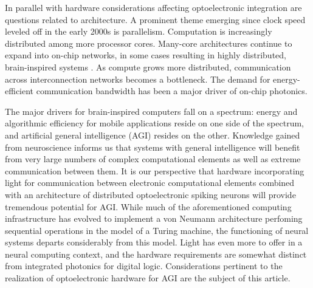 \documentclass[twocolumn]{article}
\begin{document}
In parallel with hardware considerations affecting optoelectronic integration are questions related to architecture. A prominent theme emerging since clock speed leveled off in the early 2000s is parallelism. Computation is increasingly distributed among more processor cores. Many-core architectures continue to expand into on-chip networks, in some cases resulting in highly distributed, brain-inspired systems \cite{bo2000,pfgr2013,mear2014,fuga2014,payu2017,dasr2018}. As compute grows more distributed, communication across interconnection networks becomes a bottleneck. The demand for energy-efficient communication bandwidth has been a major driver of on-chip photonics.

The major drivers for brain-inspired computers fall on a spectrum: energy and algorithmic efficiency for mobile applications reside on one side of the spectrum, and artificial general intelligence (AGI) resides on the other. Knowledge gained from neuroscience informs us that systems with general intelligence will benefit from very large numbers of complex computational elements as well as extreme communication between them. It is our perspective that hardware incorporating light for communication between electronic computational elements combined with an architecture of distributed optoelectronic spiking neurons will provide tremendous potential for AGI. While much of the aforementioned computing infrastructure has evolved to implement a von Neumann architecture perfoming sequential operations in the model of a Turing machine, the functioning of neural systems departs considerably from this model. Light has even more to offer in a neural computing context, and the hardware requirements are somewhat distinct from integrated photonics for digital logic. Considerations pertinent to the realization of optoelectronic hardware for AGI are the subject of this article. 
\end{document}
